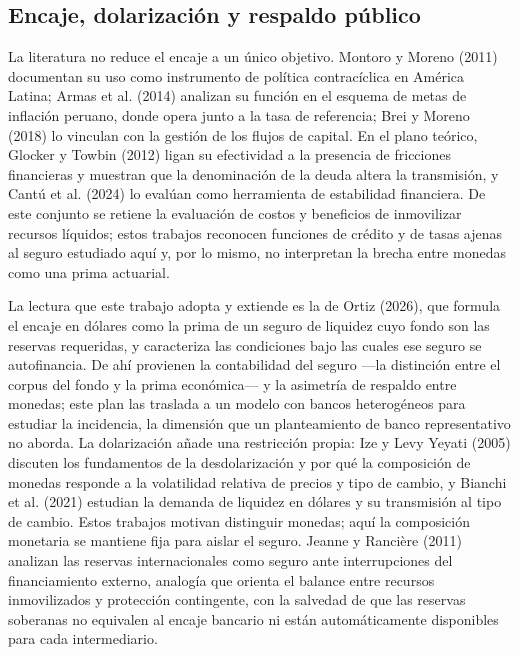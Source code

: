 \documentclass[11pt,a4paper]{article}
\begin{document}
\subsection{Encaje, dolarización y respaldo público}
La literatura no reduce el encaje a un único objetivo. Montoro y Moreno (2011) documentan su uso como instrumento de política contracíclica en América Latina; Armas et al. (2014) analizan su función en el esquema de metas de inflación peruano, donde opera junto a la tasa de referencia; Brei y Moreno (2018) lo vinculan con la gestión de los flujos de capital. En el plano teórico, Glocker y Towbin (2012) ligan su efectividad a la presencia de fricciones financieras y muestran que la denominación de la deuda altera la transmisión, y Cantú et al. (2024) lo evalúan como herramienta de estabilidad financiera. De este conjunto se retiene la evaluación de costos y beneficios de inmovilizar recursos líquidos; estos trabajos reconocen funciones de crédito y de tasas ajenas al seguro estudiado aquí y, por lo mismo, no interpretan la brecha entre monedas como una prima actuarial.

La lectura que este trabajo adopta y extiende es la de Ortiz (2026), que formula el encaje en dólares como la prima de un seguro de liquidez cuyo fondo son las reservas requeridas, y caracteriza las condiciones bajo las cuales ese seguro se autofinancia. De ahí provienen la contabilidad del seguro ---la distinción entre el corpus del fondo y la prima económica--- y la asimetría de respaldo entre monedas; este plan las traslada a un modelo con bancos heterogéneos para estudiar la incidencia, la dimensión que un planteamiento de banco representativo no aborda. La dolarización añade una restricción propia: Ize y Levy Yeyati (2005) discuten los fundamentos de la desdolarización y por qué la composición de monedas responde a la volatilidad relativa de precios y tipo de cambio, y Bianchi et al. (2021) estudian la demanda de liquidez en dólares y su transmisión al tipo de cambio. Estos trabajos motivan distinguir monedas; aquí la composición monetaria se mantiene fija para aislar el seguro. Jeanne y Rancière (2011) analizan las reservas internacionales como seguro ante interrupciones del financiamiento externo, analogía que orienta el balance entre recursos inmovilizados y protección contingente, con la salvedad de que las reservas soberanas no equivalen al encaje bancario ni están automáticamente disponibles para cada intermediario.
\end{document}
